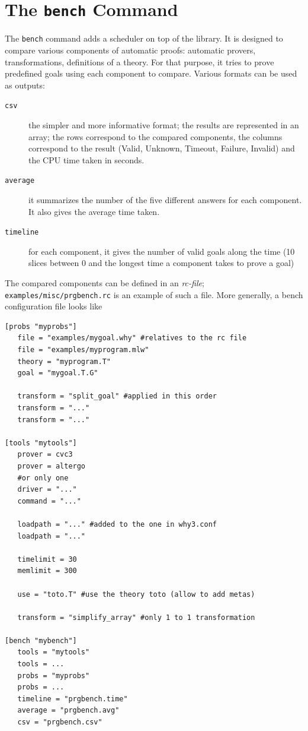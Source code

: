 \section{The \texttt{bench} Command}

The \texttt{bench} command adds a scheduler on top of the \why
library. It is designed to compare various components
of automatic proofs: automatic provers, transformations, definitions
of a theory. For that purpose, it tries to prove predefined goals using
each component to compare. Various formats can be used as outputs:
\begin{description}
\item[\texttt{csv}] the simpler and more informative format; the results are
  represented in an array; the rows correspond to the
  compared components, the columns correspond to the result
  (Valid, Unknown, Timeout, Failure, Invalid) and the CPU time taken in seconds.
\item[\texttt{average}] it summarizes the number of the five different answers
  for each component. It also gives the average time taken.
\item[\texttt{timeline}] for each component, it gives the number of valid goals
  along the time (10 slices between 0 and the longest time a component
  takes to prove a goal)
\end{description}

The compared components can be defined in an \emph{rc-file};
\texttt{examples/misc/prgbench.rc} is an example of such a file. More
generally, a bench configuration file looks like
\begin{verbatim}
[probs "myprobs"]
   file = "examples/mygoal.why" #relatives to the rc file
   file = "examples/myprogram.mlw"
   theory = "myprogram.T"
   goal = "mygoal.T.G"

   transform = "split_goal" #applied in this order
   transform = "..."
   transform = "..."

[tools "mytools"]
   prover = cvc3
   prover = altergo
   #or only one
   driver = "..."
   command = "..."

   loadpath = "..." #added to the one in why3.conf
   loadpath = "..."

   timelimit = 30
   memlimit = 300

   use = "toto.T" #use the theory toto (allow to add metas)

   transform = "simplify_array" #only 1 to 1 transformation

[bench "mybench"]
   tools = "mytools"
   tools = ...
   probs = "myprobs"
   probs = ...
   timeline = "prgbench.time"
   average = "prgbench.avg"
   csv = "prgbench.csv"
\end{verbatim}

